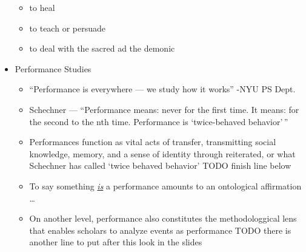 \documentclass[12pt]{article}
\begin{document}
\begin{itemize}
\begin{itemize}
                    \item to heal 
                    \item to teach or persuade 
                    \item to deal with the sacred ad the demonic
                \end{itemize}
                \item Performance Studies
                \begin{itemize}
                    \item ``Performance is everywhere --- we study how it works'' -NYU PS Dept.
                    \item Schechner --- ``Performance means: never for the first time. It means: for the second to the nth time. Performance is `twice-behaved behavior'\,''
                    \item Performances function as vital acts of transfer, transmitting social knowledge, memory, and a sense of identity through reiterated, or what Schechner has called `twice behaved behavior'
TODO finish line below 
                    \item To say something \textit{\underline{is}} a performance amounts to an ontological affirmation \dots
                    \item On another level, performance also constitutes the methodologgical lens that enables scholars to analyze events as performance
TODO there is another line to put after this look in the slides
                \end{itemize}
            \end{itemize}
\end{document}
